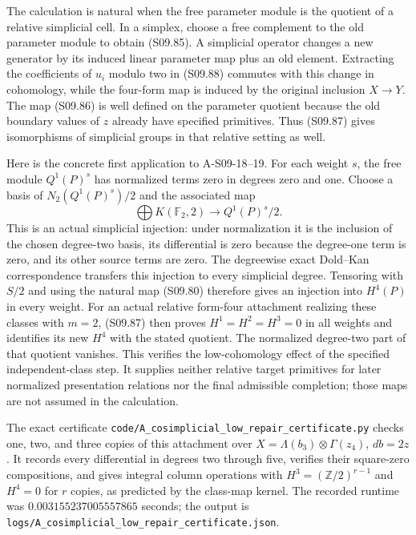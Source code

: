 The calculation is natural when the free parameter
module is the quotient of a relative simplicial
cell.  In a simplex, choose a free complement to
the old parameter module to obtain (S09.85).
A simplicial operator changes a new generator by
its induced linear parameter map plus an old
element.  Extracting the coefficients of $u_i$
modulo two in (S09.88) commutes with this change
in cohomology, while the four-form map is induced
by the original inclusion $X\to Y$.  The map
(S09.86) is well defined on the parameter quotient
because the old boundary values of $z$ already
have specified primitives.  Thus (S09.87) gives
isomorphisms of simplicial groups in that relative
setting as well.

Here is the concrete first application to A-S09-18--19.
For each weight $s$, the free module $Q^1(P)^s$
has normalized terms zero in degrees zero and one.
Choose a basis of $N_2(Q^1(P)^s)/2$ and the associated
map
\[
 \bigoplus K(\mathbb F_2,2)
                           \longrightarrow Q^1(P)^s/2.
 \tag{S09.91}
\]
This is an actual simplicial injection: under
normalization it is the inclusion of the chosen
degree-two basis, its differential is zero because
the degree-one term is zero, and its other source
terms are zero.  The degreewise exact Dold--Kan
correspondence transfers this injection to every
simplicial degree.  Tensoring with $S/2$ and using
the natural map (S09.80) therefore gives an
injection into $H^4(P)$ in every weight.
For an actual relative form-four attachment
realizing these classes with $m=2$, (S09.87)
then proves $H^1=H^2=H^3=0$ in all weights and
identifies its new $H^4$ with the stated quotient.
The normalized degree-two part of that quotient
vanishes.  This verifies the low-cohomology effect
of the specified independent-class step.
It supplies neither relative target primitives
for later normalized presentation relations nor
the final admissible completion; those maps are
not assumed in the calculation.

The exact certificate
\texttt{code/A\_cosimplicial\_low\_repair\_certificate.py}
checks one, two, and three copies of this attachment
over $X=\Lambda(b_3)\otimes\Gamma(z_4)$, $db=2z$.
It records every differential in degrees two through
five, verifies their square-zero compositions,
and gives integral column operations with
$H^3=(\mathbb Z/2)^{r-1}$ and $H^4=0$ for $r$
copies, as predicted by the class-map kernel.
The recorded runtime was $0.003155237005557865$ seconds;
the output is
\texttt{logs/A\_cosimplicial\_low\_repair\_certificate.json}.
